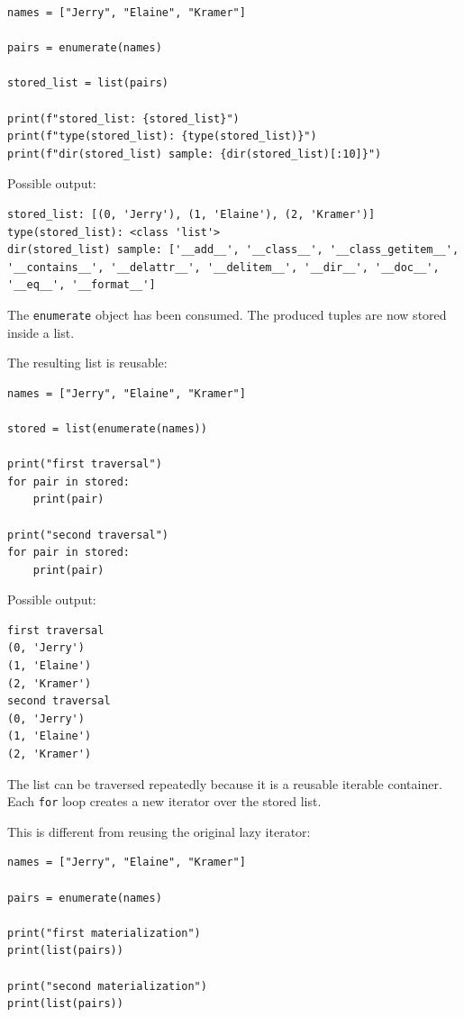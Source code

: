 \documentclass[a4paper,twoside]{report}
\begin{document}
\begin{verbatim}
names = ["Jerry", "Elaine", "Kramer"]

pairs = enumerate(names)

stored_list = list(pairs)

print(f"stored_list: {stored_list}")
print(f"type(stored_list): {type(stored_list)}")
print(f"dir(stored_list) sample: {dir(stored_list)[:10]}")
\end{verbatim}

Possible output:

\begin{verbatim}
stored_list: [(0, 'Jerry'), (1, 'Elaine'), (2, 'Kramer')]
type(stored_list): <class 'list'>
dir(stored_list) sample: ['__add__', '__class__', '__class_getitem__',
'__contains__', '__delattr__', '__delitem__', '__dir__', '__doc__',
'__eq__', '__format__']
\end{verbatim}

The \texttt{enumerate} object has been consumed. The produced tuples are now stored inside a list.

The resulting list is reusable:

\begin{verbatim}
names = ["Jerry", "Elaine", "Kramer"]

stored = list(enumerate(names))

print("first traversal")
for pair in stored:
    print(pair)

print("second traversal")
for pair in stored:
    print(pair)
\end{verbatim}

Possible output:

\begin{verbatim}
first traversal
(0, 'Jerry')
(1, 'Elaine')
(2, 'Kramer')
second traversal
(0, 'Jerry')
(1, 'Elaine')
(2, 'Kramer')
\end{verbatim}

The list can be traversed repeatedly because it is a reusable iterable container. Each \texttt{for} loop creates a new iterator over the stored list.

This is different from reusing the original lazy iterator:

\begin{verbatim}
names = ["Jerry", "Elaine", "Kramer"]

pairs = enumerate(names)

print("first materialization")
print(list(pairs))

print("second materialization")
print(list(pairs))
\end{verbatim}
\end{document}
